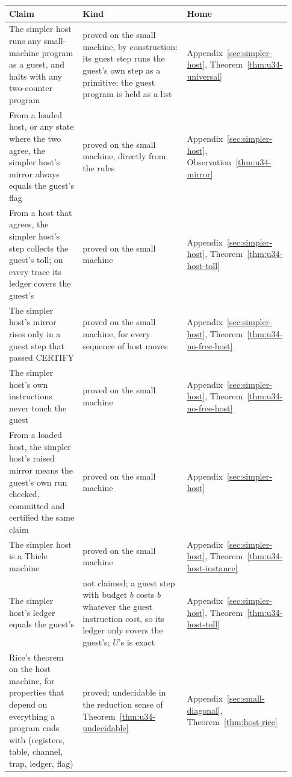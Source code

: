 \documentclass[11pt,twoside]{article}
\theoremstyle{thielethm}
\theoremstyle{thieledef}
\theoremstyle{thieledef}
\theoremstyle{thieledef}
\theoremstyle{thielethm}
\theoremstyle{thieleobs}
\theoremstyle{thielethm}
\begin{document}
\begingroup\small
\begin{longtable}{@{}>{\raggedright\arraybackslash}p{0.242\linewidth}>{\raggedright\arraybackslash}p{0.344\linewidth}>{\raggedright\arraybackslash}p{0.344\linewidth}@{}}
\toprule
\textbf{Claim} & \textbf{Kind} & \textbf{Home} \\
\midrule
\endhead
\bottomrule
\endlastfoot
The simpler host runs any small-machine program as a guest, and halts with any two-counter program & proved on the small machine, by construction: its guest step runs the guest's own step as a primitive; the guest program is held as a list & Appendix~\ref{sec:simpler-host}, Theorem~\ref{thm:u34-universal} \\
From a loaded host, or any state where the two agree, the simpler host's mirror always equals the guest's flag & proved on the small machine, directly from the rules & Appendix~\ref{sec:simpler-host}, Observation~\ref{thm:u34-mirror} \\
From a host that agrees, the simpler host's step collects the guest's toll; on every trace its ledger covers the guest's & proved on the small machine & Appendix~\ref{sec:simpler-host}, Theorem~\ref{thm:u34-host-toll} \\
The simpler host's mirror rises only in a guest step that passed CERTIFY & proved on the small machine, for every sequence of host moves & Appendix~\ref{sec:simpler-host}, Theorem~\ref{thm:u34-no-free-host} \\
The simpler host's own instructions never touch the guest & proved on the small machine & Appendix~\ref{sec:simpler-host}, Theorem~\ref{thm:u34-no-free-host} \\
From a loaded host, the simpler host's raised mirror means the guest's own run checked, committed and certified the same claim & proved on the small machine  & Appendix~\ref{sec:simpler-host} \\
The simpler host is a Thiele machine & proved on the small machine & Appendix~\ref{sec:simpler-host}, Theorem~\ref{thm:u34-host-instance} \\
The simpler host's ledger equals the guest's & not claimed; a guest step with budget $b$ costs $b$ whatever the guest instruction cost, so its ledger only covers the guest's; $U$'s is exact & Appendix~\ref{sec:simpler-host}, Theorem~\ref{thm:u34-host-toll} \\
Rice's theorem on the host machine, for properties that depend on everything a program ends with (registers, table, channel, trap, ledger, flag) & proved; undecidable in the reduction sense of Theorem~\ref{thm:u34-undecidable} & Appendix~\ref{sec:small-diagonal}, Theorem~\ref{thm:host-rice} \\

\end{longtable}
\end{document}
